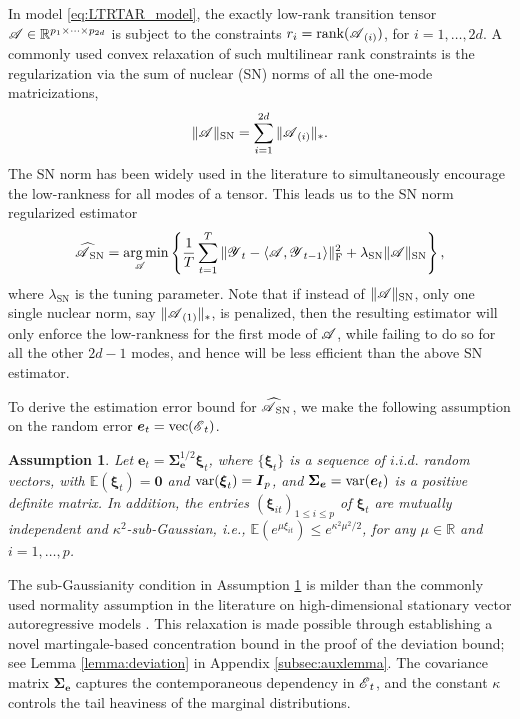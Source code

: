 \documentclass[12pt]{article}
\newtheorem{assumption}{Assumption}
\DeclareMathOperator*{\argmin}{arg\,min}
\newcommand{\bm}{\boldsymbol}
\newcommand{\cm}[1]{\mbox{\boldmath$\mathscr{#1}$}}
\begin{document}
In model \eqref{eq:LTRTAR_model}, the exactly low-rank transition tensor $\cm{A}\in\mathbb{R}^{p_1\times\cdots\times p_{2d}}$  is subject to the constraints $r_i=\text{rank}(\cm{A}_{(i)})$, for $i=1,\dots, 2d$. A commonly used convex relaxation of such multilinear rank constraints is the regularization via the sum of nuclear (SN) norms of all the one-mode matricizations,
\begin{equation}\label{eq:SN_norm}
\|\cm{A}\|_{\text{SN}}=\sum_{i=1}^{2d}\|\cm{A}_{(i)}\|_*.
\end{equation}
The SN norm has been widely used in the literature  \citep{gandy2011tensor, tomioka2011statistical, liu2013tensor, raskutti2019convex} to simultaneously encourage the low-rankness for all modes of a tensor. 
This leads us to the SN norm regularized estimator
\begin{equation}
\cm{\widehat{A}}_{\text{SN}}=\underset{\scalebox{0.7}{\cm{A}}}{\argmin}\left\{\frac{1}{T}\sum_{t=1}^T\|\cm{Y}_t-\langle\cm{A},\cm{Y}_{t-1}\rangle\|_\text{F}^2+\lambda_{\textup{SN}}\|\cm{A}\|_{\text{SN}}\right\},
\end{equation}
where $\lambda_{\text{SN}}$ is the tuning parameter. Note that if instead of  $\|\cm{A}\|_{\text{SN}}$, only one single nuclear norm, say $\|\cm{A}_{(1)}\|_*$, is penalized, then the resulting estimator will only enforce the low-rankness for the first mode of $\cm{A}$,  while failing to do so for all the other $2d-1$ modes, and hence will be less efficient than the above SN estimator.

To derive the estimation error bound for $\cm{\widehat{A}}_{\text{SN}}$, we make the following assumption on the random error $\bm{e}_t=\textup{vec}(\cm{E}_t)$.

\begin{assumption}
	\label{asmp:gaussian}
	Let $\bm{e}_t=\bm{\Sigma}_{\bm{e}}^{1/2}\bm{\xi}_t$, where $\{\bm{\xi}_t\}$ is a sequence of $i.i.d.$ random vectors, with $\mathbb{E}(\bm{\xi}_t)=\bm{0}$ and $\textup{var}(\bm{\xi}_t)=\bm{I}_p$, and $\bm{\Sigma_e}=\textup{var}(\bm{e}_t)$ is  a positive definite matrix. In addition, the entries $(\bm{\xi}_{it})_{1\leq i\leq p}$ of  $\bm{\xi}_t$ are mutually independent and $\kappa^2$-sub-Gaussian, i.e.,
	$\mathbb{E}(e^{\mu\xi_{it}})\leq e^{\kappa^2\mu^2/2}$, for any $\mu\in\mathbb{R}$ and  $i=1,\dots, p$.
\end{assumption}

The sub-Gaussianity condition in Assumption \ref{asmp:gaussian} is milder than the  commonly used normality assumption in the literature  on high-dimensional stationary vector autoregressive models \citep{basu2015regularized, raskutti2019convex}. This relaxation is made possible through establishing a novel martingale-based concentration bound in the proof of the deviation bound; see Lemma \ref{lemma:deviation} in Appendix \ref{subsec:auxlemma}. The covariance matrix $\bm{\Sigma_e}$ captures the contemporaneous dependency in $\cm{E}_t$, and the constant $\kappa$ controls the tail heaviness of the marginal distributions.
\end{document}
